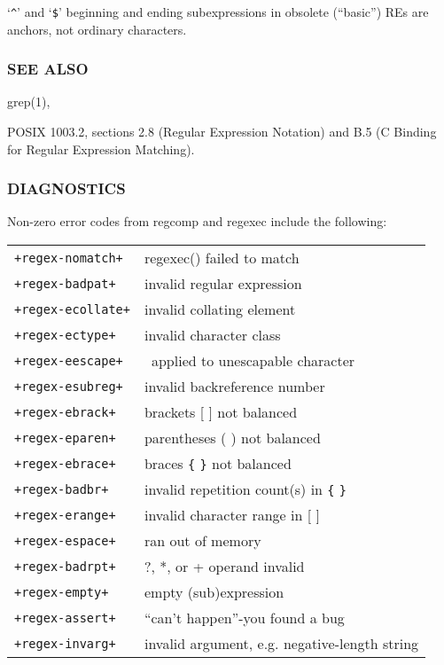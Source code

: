 `\verb|^|' and `\verb|$|' beginning and ending subexpressions in
obsolete (``basic'') REs are anchors, not ordinary characters.

\subsubsection{SEE ALSO}

grep(1), 

POSIX 1003.2, sections 2.8 (Regular Expression Notation) and B.5 (C
Binding for Regular Expression Matching).

\subsubsection{DIAGNOSTICS}%
\label{sec:mre3diag}

Non-zero error codes from regcomp and regexec include the following:

\begin{tabular}{ll}
\texttt{+regex-nomatch+} & regexec() failed to match\\
\texttt{+regex-badpat+} &  invalid regular expression\\
\texttt{+regex-ecollate+} & invalid collating element\\
\texttt{+regex-ectype+} &  invalid character class\\
\texttt{+regex-eescape+} & \ applied to unescapable character\\
\texttt{+regex-esubreg+} & invalid backreference number\\
\texttt{+regex-ebrack+} & brackets [ ] not balanced\\
\texttt{+regex-eparen+} & parentheses ( ) not balanced\\
\texttt{+regex-ebrace+} & braces \verb|{| \verb|}| not balanced\\
\texttt{+regex-badbr+} & invalid repetition count(s) in \verb|{| \verb|}|\\
\texttt{+regex-erange+} & invalid character range in [ ]\\
\texttt{+regex-espace+} & ran out of memory\\
\texttt{+regex-badrpt+} & ?, *, or + operand invalid\\
\texttt{+regex-empty+} & empty (sub)expression\\
\texttt{+regex-assert+} &``can't happen''-you found a bug\\
\texttt{+regex-invarg+} & invalid argument, e.g. negative-length string
\end{tabular}
 
